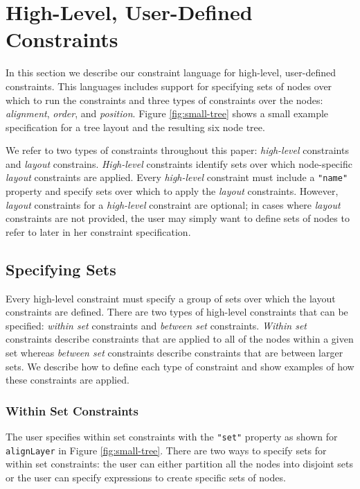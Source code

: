 \section{High-Level, User-Defined Constraints}
\smallTree
In this section we describe our constraint language for high-level, user-defined constraints. This languages includes support for specifying sets of nodes over which to run the constraints and three types of constraints over the nodes: \emph{alignment}, \emph{order}, and \emph{position}. Figure \ref{fig:small-tree} shows a small example specification for a tree layout and the resulting six node tree. 

We refer to two types of constraints throughout this paper: \emph{high-level} constraints and \emph{layout} constrains. \emph{High-level} constraints identify sets over which node-specific \emph{layout} constraints are applied. Every \emph{high-level} constraint must include a \texttt{"name"} property and specify sets over which to apply the \emph{layout} constraints. However, \emph{layout} constraints for a \emph{high-level} constraint are optional; in cases where \emph{layout} constraints are not provided, the user may simply want to define sets of nodes to refer to later in her constraint specification.

\subsection{Specifying Sets}
\label{sec:sets}
Every high-level constraint must specify a group of sets over which the layout constraints are defined. There are two types of high-level constraints that can be specified: \emph{within set} constraints and \emph{between set} constraints. \emph{Within set} constraints describe constraints that are applied to all of the nodes within a given set whereas \emph{between set} constraints describe constraints that are between larger sets. We describe how to define each type of constraint and show examples of how these constraints are applied.

\subsubsection{Within Set Constraints}
The user specifies within set constraints with the \texttt{"set"} property as shown for \texttt{alignLayer} in Figure \ref{fig:small-tree}. There are two ways to specify sets for within set constraints: the user can either partition all the nodes into disjoint sets or the user can specify expressions to create specific sets of nodes.

